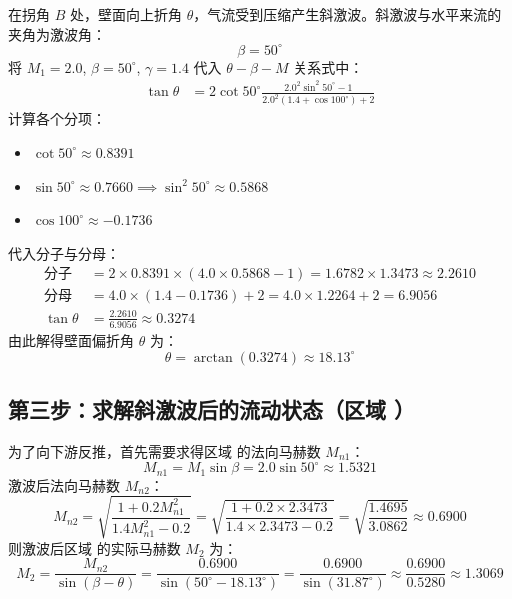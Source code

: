 \documentclass[a4paper,11pt]{article}
\begin{document}
在拐角 $B$ 处，壁面向上折角 $\theta$，气流受到压缩产生斜激波。斜激波与水平来流的夹角为激波角：
\[
\beta = 50^\circ
\]
将 $M_1 = 2.0$, $\beta = 50^\circ$, $\gamma = 1.4$ 代入 $\theta-\beta-M$ 关系式中：
\begin{align*}
    \tan \theta &= 2 \cot 50^\circ \frac{2.0^2 \sin^2 50^\circ - 1}{2.0^2 (1.4 + \cos 100^\circ) + 2}
\end{align*}
计算各个分项：
\begin{itemize}
    \item $\cot 50^\circ \approx 0.8391$
    \item $\sin 50^\circ \approx 0.7660 \implies \sin^2 50^\circ \approx 0.5868$
    \item $\cos 100^\circ \approx -0.1736$
\end{itemize}
代入分子与分母：
\begin{align*}
    \text{分子} &= 2 \times 0.8391 \times (4.0 \times 0.5868 - 1) = 1.6782 \times 1.3473 \approx 2.2610 \\
    \text{分母} &= 4.0 \times (1.4 - 0.1736) + 2 = 4.0 \times 1.2264 + 2 = 6.9056 \\
    \tan \theta &= \frac{2.2610}{6.9056} \approx 0.3274
\end{align*}
由此解得壁面偏折角 $\theta$ 为：
\begin{equation}
    \theta = \arctan(0.3274) \approx 18.13^\circ
\end{equation}

\subsection{第三步：求解斜激波后的流动状态（区域 \uppercase\expandafter{}）}

为了向下游反推，首先需要求得区域 \uppercase\expandafter{} 的法向马赫数 $M_{n1}$：
\[
M_{n1} = M_1 \sin \beta = 2.0 \sin 50^\circ \approx 1.5321
\]
激波后法向马赫数 $M_{n2}$：
\[
M_{n2} = \sqrt{\frac{1 + 0.2 M_{n1}^2}{1.4 M_{n1}^2 - 0.2}} = \sqrt{\frac{1 + 0.2 \times 2.3473}{1.4 \times 2.3473 - 0.2}} = \sqrt{\frac{1.4695}{3.0862}} \approx 0.6900
\]
则激波后区域 \uppercase\expandafter{} 的实际马赫数 $M_2$ 为：
\begin{equation}
    M_2 = \frac{M_{n2}}{\sin(\beta - \theta)} = \frac{0.6900}{\sin(50^\circ - 18.13^\circ)} = \frac{0.6900}{\sin(31.87^\circ)} \approx \frac{0.6900}{0.5280} \approx 1.3069
\end{equation}
\end{document}
